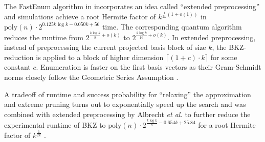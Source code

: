 The FastEnum algorithm in \citet{ABFKSW20} incorporates an idea called ``extended preprocessing'' and simulations achieve a root Hermite factor of $k^{\frac{1}{2k}(1 + o(1))}$ in $\text{poly}(n) \cdot 2^{0.125k \log k - 0.050k + 56}$ time. The corresponding quantum algorithm reduces the runtime from $2^{\frac{k \log k}{8} + o(k)}$ to $2^{\frac{k \log k}{16} + o(k)}$. In extended preprocessing, instead of preprocessing the current projected basis block of size $k$, the BKZ-reduction is applied to a block of higher dimension $\lceil (1+c)\cdot k\rceil$ for some constant $c$. Enumeration is faster on the first basis vectors as their Gram-Schmidt norms closely follow the Geometric Series Assumption \cite{MW16}. %

A tradeoff of runtime and success probability for ``relaxing'' the approximation and extreme pruning turns out to exponentially speed up the search \cite{LN20} and was combined with extended preprocessing by Albrecht \textit{et al.} to further reduce the experimental runtime of BKZ to $\text{poly}(n) \cdot 2^{\frac{k \log k}{8} - 0.654k + 25.84}$ for a root Hermite factor of $k^{\frac{1}{2k}}$ \cite{ABFKSW20}.






